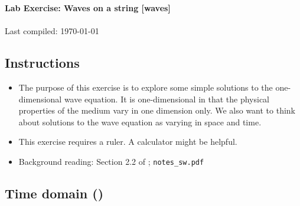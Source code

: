 \documentclass[11pt,titlepage,fleqn]{article}
\begin{document}

\begin{spacing}{1.2}
\centering
{\large \bf Lab Exercise: Waves on a string [waves]} \\
\cltag\ \\
Last compiled: \today
\end{spacing}


\subsection*{Instructions}

\begin{itemize}
\item The purpose of this exercise is to explore some simple solutions to the one-dimensional wave equation. It is one-dimensional in that the physical properties of the medium vary in one dimension only. We also want to think about solutions to the wave equation as varying in space and time.
\item This exercise requires a ruler. A calculator might be helpful.
\item Background reading: Section 2.2 of \citet{SteinWysession}; \verb+notes_sw.pdf+
\end{itemize}


\subsection*{Time domain ()}
\end{document}
